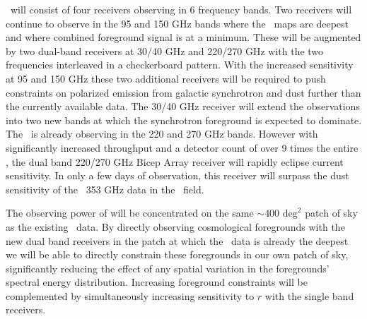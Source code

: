 \documentclass[]{spie}  %
\begin{document}
\biceparray \ will consist of four receivers observing in 6 frequency bands.
Two receivers will continue to observe in the 95 and 150 GHz bands where the
\bk \ maps are deepest and where combined foreground
signal is at a minimum. These will be augmented by two dual-band receivers at
30/40 GHz and 220/270 GHz with the two frequencies interleaved in a
checkerboard pattern. With the increased sensitivity at 95 and 150 GHz these
two additional receivers will be required to push constraints on polarized
emission from galactic synchrotron and dust further than the currently available data.
The 30/40 GHz receiver will extend the observations into two
new bands at which the synchrotron foreground is expected to dominate. The
\keckarray \ is already observing in the 220 and 270 GHz bands.  However with
significantly increased throughput and a detector count of over 9 times the
entire \keckarray , the dual band 220/270 GHz Bicep Array receiver will rapidly
eclipse current sensitivity. In only a few days of observation,
this receiver will surpass the dust sensitivity of the \planck \ 353 GHz data in
the \bk \ field. 

The observing power of \biceparray will be concentrated on the same $\sim400
\text{ deg}^2$ patch of sky as the existing \bk \ data. By directly
observing cosmological foregrounds with the new dual band receivers in the
patch at which the \bk \ data is already the deepest we will be able to
directly constrain these foregrounds in our own patch of sky, significantly
reducing the effect of any spatial variation in the foregrounds' spectral
energy distribution. Increasing foreground constraints will be complemented by
simultaneously increasing sensitivity to $r$ with the single band receivers. 





\end{document}
